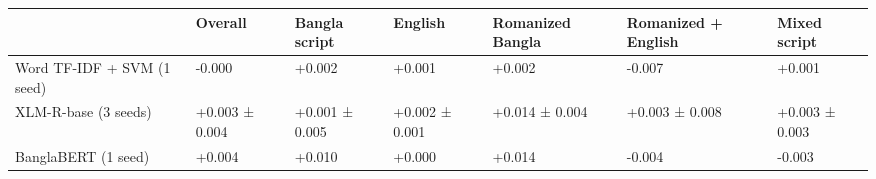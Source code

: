 \begin{tabular}{lllllll}
\toprule
 & Overall & Bangla script & English & Romanized Bangla & Romanized + English & Mixed script \\
\midrule
Word TF-IDF + SVM (1 seed) & -0.000 & +0.002 & +0.001 & +0.002 & -0.007 & +0.001 \\
XLM-R-base (3 seeds) & +0.003 ± 0.004 & +0.001 ± 0.005 & +0.002 ± 0.001 & +0.014 ± 0.004 & +0.003 ± 0.008 & +0.003 ± 0.003 \\
BanglaBERT (1 seed) & +0.004 & +0.010 & +0.000 & +0.014 & -0.004 & -0.003 \\
\bottomrule
\end{tabular}
